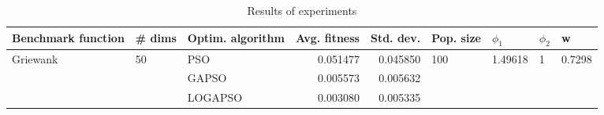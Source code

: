 \begin{table}
\centering
\caption{Results of experiments}
\begin{tabular}{lllrrllll}
\toprule
       Benchmark function &             \# dims & Optim. algorithm &  Avg. fitness &  Std. dev. &            Pop. size &               $\phi_{1}$ &         $\phi_{2}$ &                       w \\
\midrule
\multirow{3}{*}{Griewank} & \multirow{3}{*}{50} &              PSO &      0.051477 &   0.045850 & \multirow{3}{*}{100} & \multirow{3}{*}{1.49618} & \multirow{3}{*}{1} & \multirow{3}{*}{0.7298} \\
                          &                     &            GAPSO &      0.005573 &   0.005632 &                      &                          &                    &                         \\
                          &                     &          LOGAPSO &      0.003080 &   0.005335 &                      &                          &                    &                         \\
\bottomrule
\end{tabular}
\end{table}
